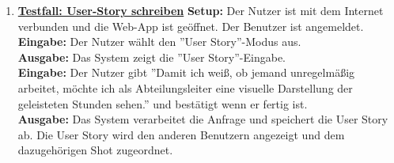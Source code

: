 \begin{enumerate}
	\item \underline{\textbf{Testfall: User-Story schreiben}} \linebreak
	\textbf{Setup:} Der Nutzer ist mit dem Internet verbunden und die Web-App ist geöffnet. Der Benutzer ist angemeldet.\\
	\textbf{Eingabe:} Der Nutzer wählt den ''User Story''-Modus aus. \\
	\textbf{Ausgabe:} Das System zeigt die ''User Story''-Eingabe. \\
	\textbf{Eingabe:} Der Nutzer gibt ''Damit ich weiß, ob jemand unregelmäßig arbeitet,
möchte ich als Abteilungsleiter eine visuelle Darstellung der geleisteten Stunden sehen.'' und bestätigt wenn er fertig ist.\\
	\textbf{Ausgabe:} Das System verarbeitet die Anfrage und speichert die User Story ab. Die User Story wird den anderen Benutzern angezeigt und dem dazugehörigen Shot zugeordnet. \\
	
	

\end{enumerate}

